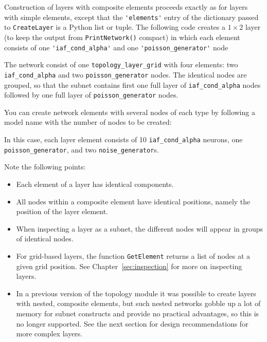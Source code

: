 \documentclass[a4paper,12pt]{report}
\begin{document}
Construction of layers with composite elements proceeds exactly as for
layers with simple elements, except that the \lstinline!'elements'!
entry of the dictionary passed to \lstinline!CreateLayer! is a Python
list or tuple. The following code creates a $1\times 2$ layer (to keep
the output from \lstinline!PrintNetwork()! compact) in which
each element consists of one \lstinline!'iaf_cond_alpha'! and one
\lstinline!'poisson_generator'! node
%


%
The network consist of one \lstinline!topology_layer_grid! with four
elements: two \lstinline!iaf_cond_alpha! and two
\lstinline!poisson_generator! nodes. The identical nodes are grouped, so
that the subnet contains first one full layer of \lstinline!iaf_cond_alpha!
nodes followed by one full layer of \lstinline!poisson_generator! nodes.

You can create network elements with several nodes of each type by
following a model name with the number of nodes to be created:
%


%
In this case, each layer element consists of 10
\lstinline!iaf_cond_alpha! neurons, one \lstinline!poisson_generator!,
and two \lstinline!noise_generator!s. 

Note the following points:
\begin{itemize}
\item Each element of a layer has identical components.
\item All nodes within a composite element have identical positions,
  namely the position of the layer element.
\item When inspecting a layer as a subnet, the different nodes will appear
  in groups of identical nodes.
\item For grid-based layers, the function \lstinline!GetElement! returns a
  list of nodes at a given grid position. See Chapter~\ref{sec:inspection}
  for more on inspecting layers.
\item In a previous version of the topology module it was possible to
  create layers with nested, composite elements, but such nested networks
  gobble up a lot of memory for subnet constructs and provide no practical
  advantages, so this is no longer supported. See the next section for
  design recommendations for more complex layers.
\end{itemize}
\end{document}
